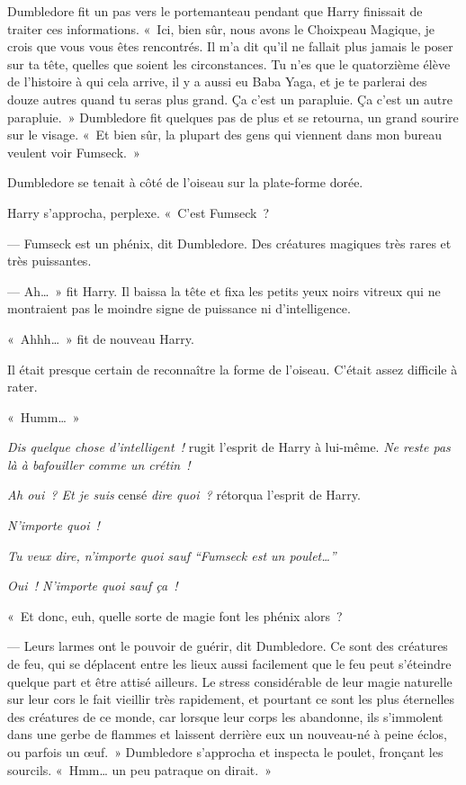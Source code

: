 Dumbledore fit un pas vers le portemanteau pendant que Harry finissait de traiter ces informations.
«~Ici, bien sûr, nous avons le Choixpeau Magique, je crois que vous vous êtes rencontrés.
Il m'a dit qu'il ne fallait plus jamais le poser sur ta tête, quelles que soient les circonstances.
Tu n'es que le quatorzième élève de l'histoire à qui cela arrive, il y a aussi eu Baba Yaga, et je te parlerai des douze autres quand tu seras plus grand.
Ça c'est un parapluie.
Ça c'est un autre parapluie.~»
Dumbledore fit quelques pas de plus et se retourna, un grand sourire sur le visage.
«~Et bien sûr, la plupart des gens qui viennent dans mon bureau veulent voir Fumseck.~»

Dumbledore se tenait à côté de l'oiseau sur la plate-forme dorée.

Harry s'approcha, perplexe.
«~C'est Fumseck~?

--- Fumseck est un phénix, dit Dumbledore.
Des créatures magiques très rares et très puissantes.

--- Ah…~» fit Harry.
Il baissa la tête et fixa les petits yeux noirs vitreux qui ne montraient pas le moindre signe de puissance ni d'intelligence.

«~Ahhh…~» fit de nouveau Harry.

Il était presque certain de reconnaître la forme de l'oiseau.
C'était assez difficile à rater.

«~Humm…~»


\emph{Dis quelque chose d'intelligent~!} rugit l'esprit de Harry à lui-même.
\emph{Ne reste pas là à bafouiller comme un crétin~!}

\emph{Ah oui~? Et je suis} censé \emph{dire quoi~?} rétorqua l'esprit de Harry.

\emph{N'importe quoi~!}

\emph{Tu veux dire, n'importe quoi sauf “Fumseck est un poulet…”}

\emph{Oui~!
N'importe quoi sauf ça~!}

«~Et donc, euh, quelle sorte de magie font les phénix alors~?

--- Leurs larmes ont le pouvoir de guérir, dit Dumbledore.
Ce sont des créatures de feu, qui se déplacent entre les lieux aussi facilement que le feu peut s'éteindre quelque part et être attisé ailleurs.
Le stress considérable de leur magie naturelle sur leur cors le fait vieillir très rapidement, et pourtant ce sont les plus éternelles des créatures de ce monde, car lorsque leur corps les abandonne, ils s'immolent dans une gerbe de flammes et laissent derrière eux un nouveau-né à peine éclos, ou parfois un œuf.~»
Dumbledore s'approcha et inspecta le poulet, fronçant les sourcils.
«~Hmm… un peu patraque on dirait.~»

